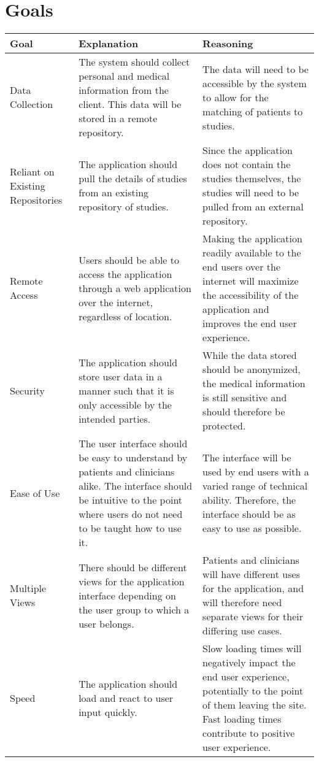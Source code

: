 \documentclass{article}
\begin{document}

\section{Goals}

\begin{table}[H]
\centering
\begin{tabular}{| p{3cm} | p{5cm} | p{5cm} |}
\hline
Goal & Explanation & Reasoning \\
\hline  \hline
Data Collection & The system should collect personal and medical information from the client. This data will be stored in a remote repository. & The data will need to be accessible by the system to allow for the matching of patients to studies. \\
\hline
Reliant on Existing Repositories & The application should pull the details of studies from an existing repository of studies. & Since the application does not contain the studies themselves, the studies will need to be pulled from an external repository. \\
\hline
Remote Access & Users should be able to access the application through a web application over the internet, regardless of location. & Making the application readily available to the end users over the internet will maximize the accessibility of the application and improves the end user experience. \\
\hline
Security & The application should store user data in a manner such that it is only accessible by the intended parties. & While the data stored should be anonymized, the medical information is still sensitive and should therefore be protected. \\
\hline
Ease of Use & The user interface should be easy to understand by patients and clinicians alike. The interface should be intuitive to the point where users do not need to be taught how to use it. & The interface will be used by end users with a varied range of technical ability. Therefore, the interface should be as easy to use as possible. \\
\hline
Multiple Views & There should be different views for the application interface depending on the user group to which a user belongs. & Patients and clinicians will have different uses for the application, and will therefore need separate views for their differing use cases. \\
\hline
Speed & The application should load and react to user input quickly. &  Slow loading times will negatively impact the end user experience, potentially to the point of them leaving the site. Fast loading times contribute to positive user experience. \\
\hline

\end{tabular}
\end{table}
\end{document}
